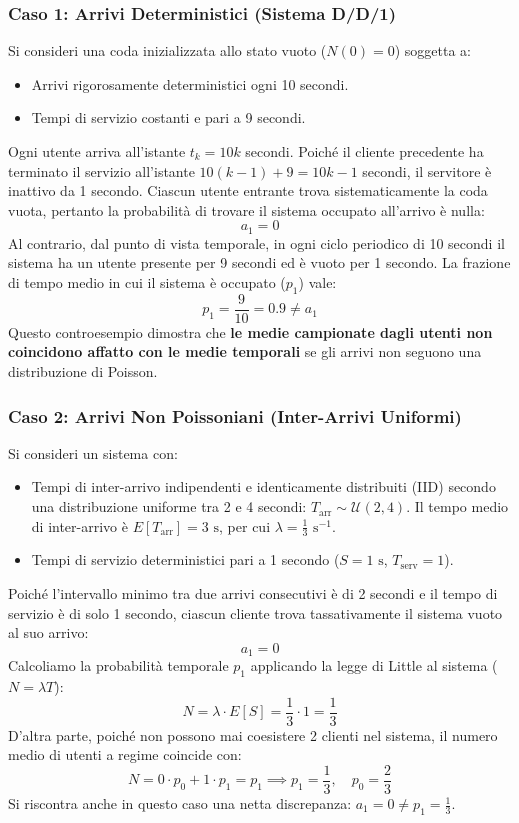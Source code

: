 \documentclass[11pt, a4paper]{article}
\begin{document}
\subsubsection{Caso 1: Arrivi Deterministici (Sistema D/D/1)}

Si consideri una coda inizializzata allo stato vuoto ($N(0) = 0$) soggetta a:
\begin{itemize}[noitemsep]
    \item Arrivi rigorosamente deterministici ogni 10 secondi.
    \item Tempi di servizio costanti e pari a 9 secondi.
\end{itemize}
Ogni utente arriva all'istante $t_k = 10k$ secondi. Poiché il cliente precedente ha terminato il servizio all'istante $10(k-1) + 9 = 10k - 1$ secondi, il servitore è inattivo da 1 secondo. Ciascun utente entrante trova sistematicamente la coda vuota, pertanto la probabilità di trovare il sistema occupato all'arrivo è nulla:
\[
a_1 = 0
\]
Al contrario, dal punto di vista temporale, in ogni ciclo periodico di 10 secondi il sistema ha un utente presente per 9 secondi ed è vuoto per 1 secondo. La frazione di tempo medio in cui il sistema è occupato ($p_1$) vale:
\[
p_1 = \frac{9}{10} = 0.9 \neq a_1
\]
Questo controesempio dimostra che \textbf{le medie campionate dagli utenti non coincidono affatto con le medie temporali} se gli arrivi non seguono una distribuzione di Poisson.


\subsubsection{Caso 2: Arrivi Non Poissoniani (Inter-Arrivi Uniformi)}

Si consideri un sistema con:
\begin{itemize}[noitemsep]
    \item Tempi di inter-arrivo indipendenti e identicamente distribuiti (IID) secondo una distribuzione uniforme tra 2 e 4 secondi: $T_{\text{arr}} \sim \mathcal{U}(2, 4)$. Il tempo medio di inter-arrivo è $E[T_{\text{arr}}] = 3\text{ s}$, per cui $\lambda = \frac{1}{3}\text{ s}^{-1}$.
    \item Tempi di servizio deterministici pari a 1 secondo ($S = 1\text{ s}$, $T_{\text{serv}} = 1$).
\end{itemize}
Poiché l'intervallo minimo tra due arrivi consecutivi è di 2 secondi e il tempo di servizio è di solo 1 secondo, ciascun cliente trova tassativamente il sistema vuoto al suo arrivo:
\[
a_1 = 0
\]
Calcoliamo la probabilità temporale $p_1$ applicando la legge di Little al sistema ($N = \lambda T$):
\[
N = \lambda \cdot E[S] = \frac{1}{3} \cdot 1 = \frac{1}{3}
\]
D'altra parte, poiché non possono mai coesistere 2 clienti nel sistema, il numero medio di utenti a regime coincide con:
\[
N = 0 \cdot p_0 + 1 \cdot p_1 = p_1 \implies p_1 = \frac{1}{3}, \quad p_0 = \frac{2}{3}
\]
Si riscontra anche in questo caso una netta discrepanza: $a_1 = 0 \neq p_1 = \frac{1}{3}$.
\end{document}

